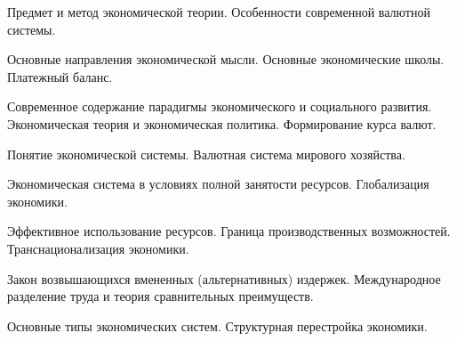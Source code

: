 


\shapkFull
\setcounter{zad}{0}

\z 	Предмет и метод экономической теории.
 \medskip
\z 	Особенности современной валютной системы. \medskip

\newpage


\shapkFull
\setcounter{zad}{0}

\z 	Основные направления экономической мысли. Основные экономические школы.
 \medskip
\z 	Платежный баланс.
 \medskip

\newpage


\shapkFull
\setcounter{zad}{0}

\z 	Современное содержание парадигмы экономического и социального развития. Экономическая теория и экономическая политика.
 \medskip
\z 	Формирование курса валют.
 \medskip

\newpage


\shapkFull
\setcounter{zad}{0}

\z 	Понятие экономической системы.  
 \medskip
\z 	Валютная система мирового хозяйства.
 \medskip

\newpage


\shapkFull
\setcounter{zad}{0}

\z 	Экономическая система в условиях полной занятости ресурсов.
 \medskip
\z 	Глобализация экономики.
 \medskip

\newpage


\shapkFull
\setcounter{zad}{0}

\z 	Эффективное использование ресурсов.  Граница производственных возможностей.
 \medskip
\z 	Транснационализация экономики.
 \medskip

\newpage


\shapkFull
\setcounter{zad}{0}

\z 	Закон возвышающихся вмененных (альтернативных) издержек.
 \medskip
\z 	Международное разделение труда и теория сравнительных преимуществ.
 \medskip

\newpage


\shapkFull
\setcounter{zad}{0}

\z 	Основные типы экономических систем. 
 \medskip
\z 	Структурная перестройка экономики.
 \medskip


